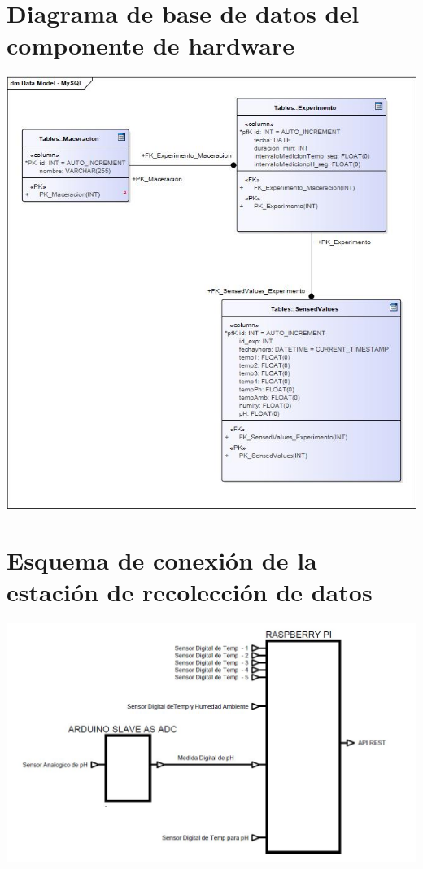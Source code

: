     \begin{minipage}{0.95\textwidth}
    \chapter{Diagrama de base de datos del componente de hardware}
        \centering
        \includegraphics[scale=0.65]{diagramaBD-Rasp.jpg}
        \label{fig:DiagramaBdRasp}
    
    \end{minipage}
    
    \begin{minipage}{0.95\textwidth}
    \chapter{Esquema de conexión de la estación de recolección de datos}
        \centering
        \includegraphics[scale=0.55]{EsquemaHardware.jpg}
        \label{fig:EsquemaHardware}
    \end{minipage}
    
